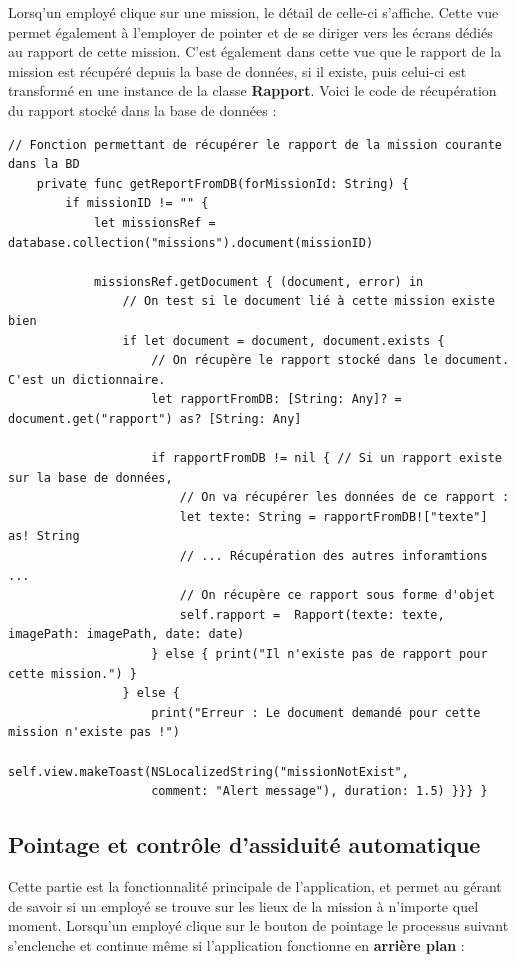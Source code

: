 \documentclass{article}
\begin{document}
Lorsq'un employé clique sur une mission, le détail de celle-ci s'affiche. Cette vue permet également à l'employer de pointer et de se diriger vers les écrans dédiés au rapport de cette mission.
C'est également dans cette vue que le rapport de la mission est récupéré depuis la base de données, si il existe, puis celui-ci est transformé en une instance de la classe \textbf{Rapport}. 
Voici le code de récupération du rapport stocké dans la base de données :
\begin{verbatim}
// Fonction permettant de récupérer le rapport de la mission courante dans la BD
    private func getReportFromDB(forMissionId: String) {
        if missionID != "" {
            let missionsRef = database.collection("missions").document(missionID)
            
            missionsRef.getDocument { (document, error) in
                // On test si le document lié à cette mission existe bien
                if let document = document, document.exists {
                    // On récupère le rapport stocké dans le document. C'est un dictionnaire.
                    let rapportFromDB: [String: Any]? = document.get("rapport") as? [String: Any]
                    
                    if rapportFromDB != nil { // Si un rapport existe sur la base de données,
                        // On va récupérer les données de ce rapport :           
                        let texte: String = rapportFromDB!["texte"] as! String  
                        // ... Récupération des autres inforamtions ...
                        // On récupère ce rapport sous forme d'objet 
                        self.rapport =  Rapport(texte: texte, imagePath: imagePath, date: date)
                    } else { print("Il n'existe pas de rapport pour cette mission.") }
                } else {
                    print("Erreur : Le document demandé pour cette mission n'existe pas !")
                    self.view.makeToast(NSLocalizedString("missionNotExist",
                    comment: "Alert message"), duration: 1.5) }}} }
\end{verbatim}

\subsection{Pointage et contrôle d'assiduité automatique}

Cette partie est la fonctionnalité principale de l'application, et permet au gérant de savoir si un employé se trouve sur les lieux de la mission à n'importe quel moment.
Lorsqu'un employé clique sur le bouton de pointage le processus suivant s'enclenche et continue même si l'application fonctionne en \textbf{arrière plan} :
\end{document}
